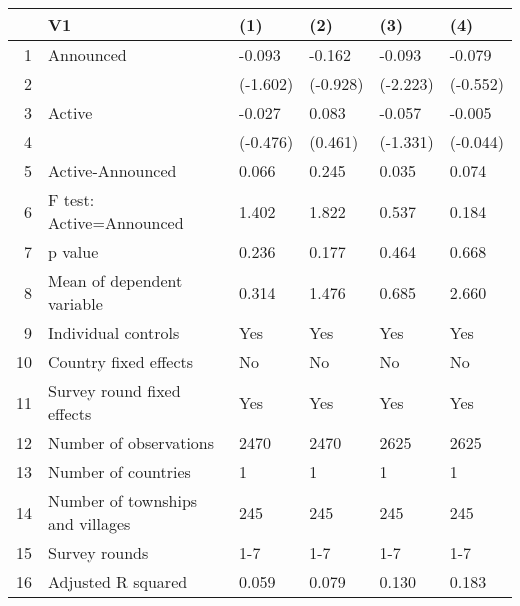 \begin{table}[ht]
\centering
\begin{tabular}{rlllll}
  \hline
 & V1 & (1) & (2) & (3) & (4) \\ 
  \hline
1 & Announced & -0.093 & -0.162 & -0.093 & -0.079 \\ 
  2 &  & (-1.602) & (-0.928) & (-2.223) & (-0.552) \\ 
  3 & Active & -0.027 & 0.083 & -0.057 & -0.005 \\ 
  4 &  & (-0.476) & (0.461) & (-1.331) & (-0.044) \\ 
  5 & Active-Announced & 0.066 & 0.245 & 0.035 & 0.074 \\ 
  6 & F test: Active=Announced & 1.402 & 1.822 & 0.537 & 0.184 \\ 
  7 & p value & 0.236 & 0.177 & 0.464 & 0.668 \\ 
  8 & Mean of dependent variable & 0.314 & 1.476 & 0.685 & 2.660 \\ 
  9 & Individual controls & Yes & Yes & Yes & Yes \\ 
  10 & Country fixed effects & No & No & No & No \\ 
  11 & Survey round fixed effects & Yes & Yes & Yes & Yes \\ 
  12 & Number of observations & 2470 & 2470 & 2625 & 2625 \\ 
  13 & Number of countries & 1 & 1 & 1 & 1 \\ 
  14 & Number of townships and villages & 245 & 245 & 245 & 245 \\ 
  15 & Survey rounds & 1-7 & 1-7 & 1-7 & 1-7 \\ 
  16 & Adjusted R squared & 0.059 & 0.079 & 0.130 & 0.183 \\ 
   \hline
\end{tabular}
\end{table}
